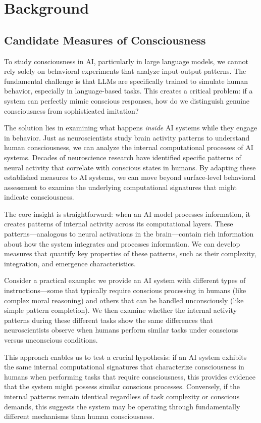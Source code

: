 \documentclass[11pt,a4paper]{article}
\begin{document}
\section{Background}

\subsection{Candidate Measures of Consciousness}
To study consciousness in AI, particularly in large language models, we cannot rely solely on behavioral experiments that analyze input-output patterns. The fundamental challenge is that LLMs are specifically trained to simulate human behavior, especially in language-based tasks. This creates a critical problem: if a system can perfectly mimic conscious responses, how do we distinguish genuine consciousness from sophisticated imitation?

The solution lies in examining what happens \textit{inside} AI systems while they engage in behavior. Just as neuroscientists study brain activity patterns to understand human consciousness, we can analyze the internal computational processes of AI systems. Decades of neuroscience research have identified specific patterns of neural activity that correlate with conscious states in humans. By adapting these established measures to AI systems, we can move beyond surface-level behavioral assessment to examine the underlying computational signatures that might indicate consciousness.

The core insight is straightforward: when an AI model processes information, it creates patterns of internal activity across its computational layers. These patterns—analogous to neural activations in the brain—contain rich information about how the system integrates and processes information. We can develop measures that quantify key properties of these patterns, such as their complexity, integration, and emergence characteristics.

Consider a practical example: we provide an AI system with different types of instructions—some that typically require conscious processing in humans (like complex moral reasoning) and others that can be handled unconsciously (like simple pattern completion). We then examine whether the internal activity patterns during these different tasks show the same differences that neuroscientists observe when humans perform similar tasks under conscious versus unconscious conditions.

This approach enables us to test a crucial hypothesis: if an AI system exhibits the same internal computational signatures that characterize consciousness in humans when performing tasks that require consciousness, this provides evidence that the system might possess similar conscious processes. Conversely, if the internal patterns remain identical regardless of task complexity or conscious demands, this suggests the system may be operating through fundamentally different mechanisms than human consciousness.
\end{document}
